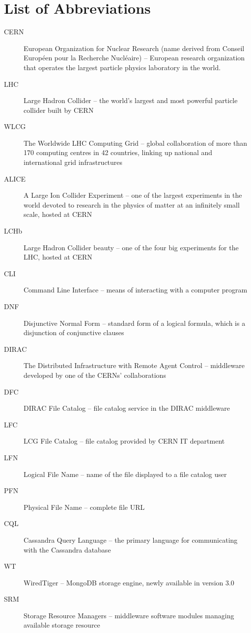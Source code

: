\documentclass[12pt,a4paper]{report}
\def\chapwithtoc#1{
\chapter*{#1}
\addcontentsline{toc}{chapter}{#1}
}
\begin{document}
\chapwithtoc{List of Abbreviations}
\begin{description}
	\item[CERN] European Organization for Nuclear Research (name derived from Conseil Européen pour la Recherche 
	Nucléaire) -- European research organization that operates the largest particle physics laboratory in the 	
	world.
	\item[LHC] Large Hadron Collider -- the world's largest and most powerful particle collider built by CERN
	\item[WLCG] The Worldwide LHC Computing Grid -- global collaboration of more than 170 computing 
	centres in 42 countries, linking up national and international grid infrastructures
	\item[ALICE] A Large Ion Collider Experiment -- one of the largest experiments in the world devoted to 
	research in the physics of matter at an infinitely small scale, hosted at CERN
	\item[LCHb] Large Hadron Collider beauty -- one of the four big experiments for the LHC, hosted at CERN
	
	\item[CLI] Command Line Interface -- means of interacting with a computer program
	
	\item[DNF] Disjunctive Normal Form -- standard form of a logical formula, which is a disjunction of 
	conjunctive clauses

	\item[DIRAC] The Distributed Infrastructure with Remote Agent Control -- middleware developed by one of the 
	CERNs' collaborations
	\item[DFC] DIRAC File Catalog -- file catalog service in the DIRAC middleware 
	\item[LFC] LCG File Catalog -- file catalog provided by CERN IT department 
	
	\item[LFN] Logical File Name -- name of the file displayed to a file catalog user 
	\item[PFN] Physical File Name -- complete file URL 
	
	\item[CQL] Cassandra Query Language -- the primary language for communicating with the Cassandra database
	
	\item[WT] WiredTiger -- MongoDB storage engine, newly available in version 3.0
	
	\item[SRM] Storage Resource Managers -- middleware software modules managing available storage resource 
\end{description}
\end{document}
